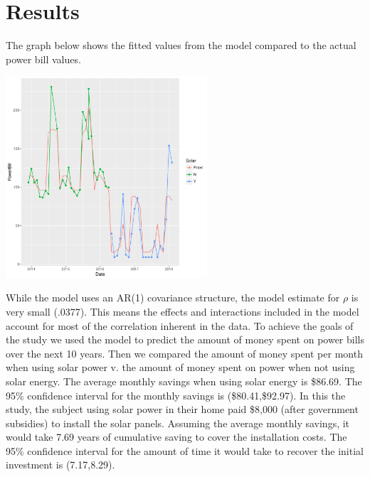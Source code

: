 \documentclass{svproc}
\begin{document}
\section{Results}

The graph below shows the fitted values from the model compared to the actual power bill values.

\begin{center}
\includegraphics [height=7.5cm]{solar_fit.pdf}
\end{center}

While the model uses an AR(1) covariance structure, the model estimate for $\rho$ is very small (.0377). This means the effects and interactions included in the model account for most of the correlation inherent in the data. To achieve the goals of the study we used the model to predict the amount of money spent on power bills over the next 10 years. Then we compared the amount of money spent per month when using solar power v. the amount of money spent on power when not using solar energy. The average monthly savings when using solar energy is \$86.69. The 95\% confidence interval for the monthly savings is (\$80.41,\$92.97). In this the study, the subject using solar power in their home paid \$8,000 (after government subsidies) to install the solar panels. Assuming the average monthly savings, it would take 7.69 years of cumulative saving to cover the installation costs. The 95\% confidence interval for the amount of time it would take to recover the initial investment is (7.17,8.29).
\end{document}
